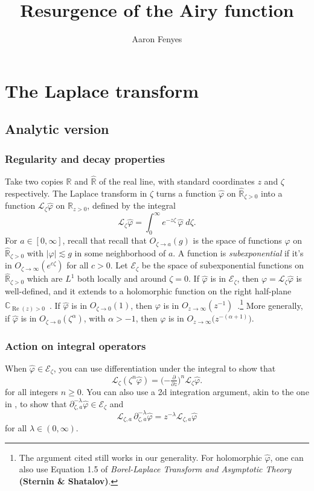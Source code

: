 \documentclass{article}
\title{Resurgence of the Airy function}
\author{Aaron Fenyes}
\theoremstyle{plain}
\newcommand{\R}{\mathbb{R}}
\newcommand{\C}{\mathbb{C}}
\newcommand{\laplace}{\mathcal{L}}
\newcommand{\fracderiv}[3]{\partial^{#1}_{#2, #3}}
\begin{document}
\maketitle
\section{The Laplace transform}
\subsection{Analytic version}
\subsubsection{Regularity and decay properties}\label{reg-decay}
Take two copies $\R$ and $\hat{\R}$ of the real line, with standard coordinates $z$ and $\zeta$ respectively. The Laplace transform in $\zeta$ turns a function $\hat{\varphi}$ on $\hat{\R}_{\zeta > 0}$ into a function $\laplace_\zeta \hat{\varphi}$ on $\R_{z > 0}$, defined by the integral
\[ \laplace_\zeta \hat{\varphi} = \int_0^\infty e^{-z \zeta}\,\hat{\varphi}\;d\zeta. \]
For $a \in [0, \infty]$, recall that recall that $O_{\zeta \to a}(g)$ is the space of functions $\varphi$ on $\hat{\R}_{\zeta > 0}$ with $|\varphi| \lesssim g$ in some neighborhood of $a$. A function is {\em subexponential} if it's in $O_{\zeta \to \infty}(e^{c\zeta})$ for all $c > 0$. Let $\mathcal{E}_\zeta$ be the space of subexponential functions on $\hat{\R}_{\zeta > 0}$ which are $L^1$ both locally and around $\zeta = 0$. If $\hat{\varphi}$ is in $\mathcal{E}_\zeta$, then $\varphi = \laplace_\zeta \hat{\varphi}$ is well-defined, and it extends to a holomorphic function on the right half-plane $\C_{\operatorname{Re}(z) > 0}$~\cite[\S 5.6]{diverg-resurg-i}. If $\hat{\varphi}$ is in $O_{\zeta \to 0}(1)$, then $\varphi$ is in $O_{z \to \infty}(z^{-1})$~\cite[equation~1.8]{laplace-tfm}.\footnote{The argument cited still works in our generality. For holomorphic $\hat{\varphi}$, one can also use Equation 1.5 of {\em Borel-Laplace Transform and Asymptotic Theory} \textbf{(Sternin \& Shatalov)}.} More generally, if $\hat{\varphi}$ is in $O_{\zeta \to 0}(\zeta^{\alpha})$, with $\alpha > -1$, then $\varphi$ is in $O_{z \to \infty}\big(z^{-(\alpha + 1)}\big)$.
\subsubsection{Action on integral operators}\label{L-int-op}
When $\hat{\varphi} \in \mathcal{E}_\zeta$, you can use differentiation under the integral to show that~\cite[Theorem~1.34]{laplace-tfm}
\begin{equation}%
\laplace_\zeta (\zeta^n \hat{\varphi}) = \big({-\tfrac{\partial}{\partial z}}\big)^n \laplace_\zeta \hat{\varphi}.
\end{equation}
for all integers $n \ge 0$. You can also use a 2d integration argument, akin to the one in \cite[Theorem~2.39]{laplace-tfm}, to show that $\fracderiv{-\lambda}{\zeta}{a} \hat{\varphi} \in \mathcal{E}_\zeta$ and
\[ \laplace_{\zeta, a}\,\fracderiv{-\lambda}{\zeta}{a} \hat{\varphi} = z^{-\lambda} \laplace_{\zeta, a} \hat{\varphi} \]
for all $\lambda \in (0, \infty)$.
\end{document}

